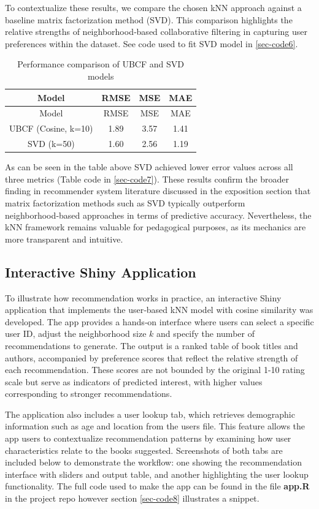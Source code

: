 \documentclass[
  12pt]{article}
\begin{document}
To contextualize these results, we compare the chosen kNN approach
against a baseline matrix factorization method (SVD). This comparison
highlights the relative strengths of neighborhood‑based collaborative
filtering in capturing user preferences within the dataset. See code
used to fit SVD model in \ref{sec-code6}.

\begin{longtable}[]{@{}cccc@{}}
\caption{Performance comparison of UBCF and SVD models}\tabularnewline
\toprule\noalign{}
Model & RMSE & MSE & MAE \\
\midrule\noalign{}
\endfirsthead
\toprule\noalign{}
Model & RMSE & MSE & MAE \\
\midrule\noalign{}
\endhead
\bottomrule\noalign{}
\endlastfoot
UBCF (Cosine, k=10) & 1.89 & 3.57 & 1.41 \\
SVD (k=50) & 1.60 & 2.56 & 1.19 \\
\end{longtable}

As can be seen in the table above SVD achieved lower error values across
all three metrics (Table code in \ref{sec-code7}). These results confirm
the broader finding in recommender system literature discussed in the
exposition section that matrix factorization methods such as SVD
typically outperform neighborhood‑based approaches in terms of
predictive accuracy. Nevertheless, the kNN framework remains valuable
for pedagogical purposes, as its mechanics are more transparent and
intuitive.

\subsection{\texorpdfstring{\textbf{Interactive Shiny
Application}}{Interactive Shiny Application}}\label{interactive-shiny-application}

To illustrate how recommendation works in practice, an interactive Shiny
application that implements the user‑based kNN model with cosine
similarity was developed. The app provides a hands‑on interface where
users can select a specific user ID, adjust the neighborhood size \(k\)
and specify the number of recommendations to generate. The output is a
ranked table of book titles and authors, accompanied by preference
scores that reflect the relative strength of each recommendation. These
scores are not bounded by the original 1-10 rating scale but serve as
indicators of predicted interest, with higher values corresponding to
stronger recommendations.

The application also includes a user lookup tab, which retrieves
demographic information such as age and location from the users file.
This feature allows the app users to contextualize recommendation
patterns by examining how user characteristics relate to the books
suggested. Screenshots of both tabs are included below to demonstrate
the workflow: one showing the recommendation interface with sliders and
output table, and another highlighting the user lookup functionality.
The full code used to make the app can be found in the file
\textbf{app.R} in the project repo however section \ref{sec-code8}
illustrates a snippet.
\end{document}
